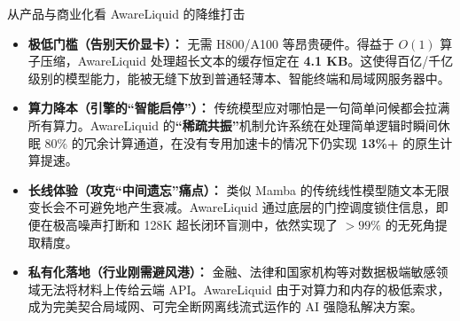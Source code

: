 ﻿\documentclass[aspectratio=169, 10pt]{beamer}
\begin{document}
\begin{frame}[allowframebreaks]{从产品与商业化看 AwareLiquid 的降维打击}
\small
\begin{itemize}\itemsep=0.4em
    \item \textbf{极低门槛（告别天价显卡）：} 无需 H800/A100 等昂贵硬件。得益于 $O(1)$ 算子压缩，AwareLiquid 处理超长文本的缓存恒定在 \textbf{4.1 KB}。这使得百亿/千亿级别的模型能力，能被无缝下放到普通轻薄本、智能终端和局域网服务器中。
    \item \textbf{算力降本（引擎的“智能启停”）：} 传统模型应对哪怕是一句简单问候都会拉满所有算力。AwareLiquid 的\textbf{“稀疏共振”}机制允许系统在处理简单逻辑时瞬间休眠 80\% 的冗余计算通道，在没有专用加速卡的情况下仍实现 \textbf{13\%+} 的原生计算提速。
    \item \textbf{长线体验（攻克“中间遗忘”痛点）：} 类似 Mamba 的传统线性模型随文本无限变长会不可避免地产生衰减。AwareLiquid 通过底层的门控调度锁住信息，即便在极高噪声打断和 128K 超长闭环盲测中，依然实现了 $>99\%$ 的无死角提取精度。
    \item \textbf{私有化落地（行业刚需避风港）：} 金融、法律和国家机构等对数据极端敏感领域无法将材料上传给云端 API。AwareLiquid 由于对算力和内存的极低索求，成为完美契合局域网、可完全断网离线流式运作的 AI 强隐私解决方案。
\end{itemize}
\end{frame}
\end{document}
